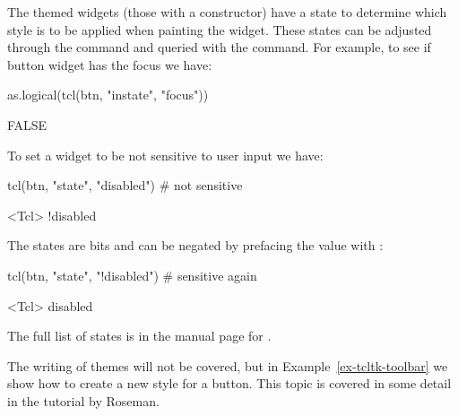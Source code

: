The themed widgets (those with a  constructor) have a state
to determine which style is to be applied when painting the
widget. These states can be adjusted through the  command
and queried with the  command. For example, to see if
button widget  has the focus we have:
\begin{Schunk}
\begin{Sinput}
 as.logical(tcl(btn, "instate", "focus"))
\end{Sinput}
\begin{Soutput}
[1] FALSE
\end{Soutput}
\end{Schunk}
To set a widget to be not sensitive to user input we have:
\begin{Schunk}
\begin{Sinput}
 tcl(btn, "state", "disabled")             # not sensitive
\end{Sinput}
\begin{Soutput}
<Tcl> !disabled 
\end{Soutput}
\end{Schunk}
The states are bits and can be negated by prefacing the value with \code{!}:
\begin{Schunk}
\begin{Sinput}
 tcl(btn, "state", "!disabled")            # sensitive again
\end{Sinput}
\begin{Soutput}
<Tcl> disabled 
\end{Soutput}
\end{Schunk}

The full list of states is in the manual page for .


The writing of themes will not be covered, but in
Example~\ref{ex-tcltk-toolbar} we show how to create a new style for a
button. This topic is covered in some detail in the \Tk\/ tutorial by Roseman.
\\




